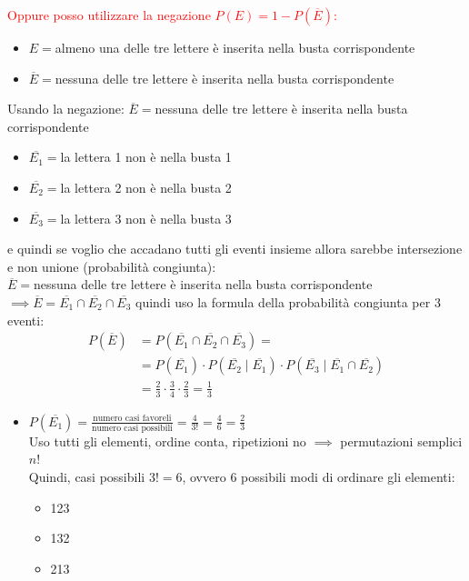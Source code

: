 \documentclass{article}  %
\theoremstyle{definition}
\begin{document}
\begin{esercizio}[Esercizio]
	\textcolor{red}{Oppure posso utilizzare la negazione $P(E)=1-P(\overline{E})$:}
	\begin{itemize}
		\item $E=$almeno una delle tre lettere è inserita nella busta corrispondente
		\item $\overline{E}=$nessuna delle tre lettere è inserita nella busta corrispondente
	\end{itemize}
	Usando la negazione:
	$\overline{E}=$nessuna delle tre lettere è inserita nella busta corrispondente
	\begin{itemize}
		\item $\overline{E_1}=$la lettera 1 non è nella busta 1
		\item $\overline{E_2}=$la lettera 2 non è nella busta 2
		\item $\overline{E_3}=$la lettera 3 non è nella busta 3
	\end{itemize}
	e quindi se voglio che accadano tutti gli eventi insieme allora sarebbe intersezione e non unione (probabilità congiunta): \\
	$\overline{E}=$nessuna delle tre lettere è inserita nella busta corrispondente $\implies \overline{E}=\overline{E_1} \cap \overline{E_2} \cap \overline{E_3}$
	quindi uso la formula della probabilità congiunta per 3 eventi:
	\begin{align*}
		P(\overline{E})
		 & = P(\overline{E_1} \cap \overline{E_2} \cap \overline{E_3}) =                                                                   \\
		 & = P(\overline{E_1}) \cdot P(\overline{E_2} \mid \overline{E_1}) \cdot P(\overline{E_3} \mid \overline{E_1} \cap \overline{E_2}) \\
		 & = \frac{2}{3} \cdot \frac{3}{4} \cdot \frac{2}{3}=\frac{1}{3}
	\end{align*}
	\begin{itemize}
		\item $P(\overline{E_1})=\frac{\text{numero casi favoreli}}{\text{numero casi possibili}}=\frac{4}{3!}=\frac{4}{6}=\frac{2}{3}$ \\
		      Uso tutti gli elementi, ordine conta, ripetizioni no $\implies$ permutazioni semplici $n!$ \\
		      Quindi, casi possibili $3!=6$, ovvero $6$ possibili modi di ordinare gli elementi:
		      \begin{itemize}
			      \item 123
			      \item 132
			      \item 213

\end{itemize}
\end{itemize}
\end{esercizio}
\end{document}
